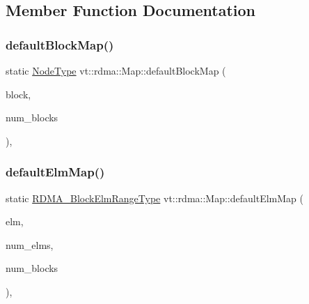 \subsection{Member Function Documentation}
\mbox{\label{structvt_1_1rdma_1_1_map_a8a37b9b72187246a37d025be09e7f6c5}} 
\subsubsection{\texorpdfstring{default\+Block\+Map()}{defaultBlockMap()}}
{\footnotesize\ttfamily static \hyperlink{namespacevt_a866da9d0efc19c0a1ce79e9e492f47e2}{Node\+Type} vt\+::rdma\+::\+Map\+::default\+Block\+Map (\begin{DoxyParamCaption}\item[{\hyperlink{namespacevt_ae54d2ca8f6bb4d65faf65118c82cd6f7}{R\+D\+M\+A\+\_\+\+Block\+Type}}]{block,  }\item[{\hyperlink{namespacevt_ae54d2ca8f6bb4d65faf65118c82cd6f7}{R\+D\+M\+A\+\_\+\+Block\+Type} \+\_\+\+\_\+attribute\+\_\+\+\_\+((unused))}]{num\+\_\+blocks }\end{DoxyParamCaption})\hspace{0.3cm}{\ttfamily [inline]}, {\ttfamily [static]}}

\mbox{\label{structvt_1_1rdma_1_1_map_aebbab4065afa91396bd259001fbd4744}} 
\subsubsection{\texorpdfstring{default\+Elm\+Map()}{defaultElmMap()}}
{\footnotesize\ttfamily static \hyperlink{namespacevt_1_1rdma_a8320f97b4a2866df60d9778486dbcd0f}{R\+D\+M\+A\+\_\+\+Block\+Elm\+Range\+Type} vt\+::rdma\+::\+Map\+::default\+Elm\+Map (\begin{DoxyParamCaption}\item[{\hyperlink{namespacevt_a2c2a902092b72056f70210c159f966f0}{R\+D\+M\+A\+\_\+\+Elm\+Type}}]{elm,  }\item[{\hyperlink{namespacevt_a2c2a902092b72056f70210c159f966f0}{R\+D\+M\+A\+\_\+\+Elm\+Type}}]{num\+\_\+elms,  }\item[{\hyperlink{namespacevt_ae54d2ca8f6bb4d65faf65118c82cd6f7}{R\+D\+M\+A\+\_\+\+Block\+Type}}]{num\+\_\+blocks }\end{DoxyParamCaption})\hspace{0.3cm}{\ttfamily [inline]}, {\ttfamily [static]}}



